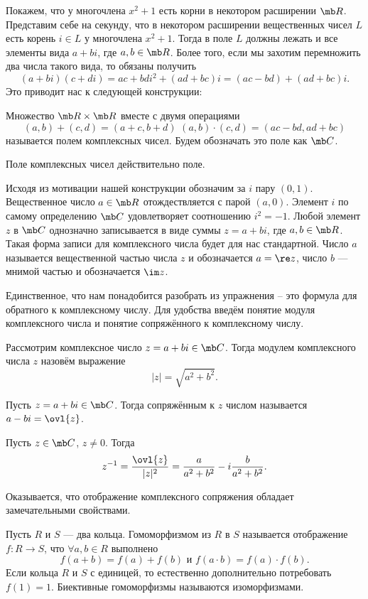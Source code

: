 Покажем, что у многочлена $x^2+1$ есть корни в некотором расширении $\mb R$. Представим себе на секунду, что в некотором расширении вещественных чисел $L$ есть корень $i\in L$ у многочлена $x^2+1$. Тогда в поле $L$ должны лежать и все элементы вида $a+bi$, где $a,b\in \mb R$. Более того, если мы захотим перемножить два числа такого вида, то обязаны получить $$(a+bi)(c+di)=ac+bdi^2+(ad+bc)i=(ac-bd)+(ad+bc)i.$$
Это приводит нас к следующей конструкции:

 Множество $\mb R \times \mb R$ вместе с двумя операциями $$(a,b)+(c,d)=(a+c,b+d)\,\,(a,b)\cdot(c,d)=(ac-bd,ad+bc)$$
называется полем комплексных чисел. Будем обозначать это  поле как $\mb C$.
\edfn

\upr Поле комплексных чисел действительно поле.
\eupr

Исходя из мотивации нашей конструкции обозначим за $i$ пару $(0,1)$. Вещественное число $a\in \mb R$ отождествляется с парой $(a,0)$. Элемент $i$ по самому определению $\mb C$ удовлетворяет соотношению $i^2=-1$. Любой элемент $z$ в $\mb C$ однозначно записывается в виде суммы $z=a+bi$, где $a,b\in \mb R$.  Такая форма записи для комплексного числа будет для нас стандартной. Число $a$ называется вещественной частью числа $z$ и обозначается $a=\re z$, число $b$ --- мнимой частью и обозначается $\im z$.

Единственное, что нам понадобится разобрать из упражнения -- это формула для обратного  к комплексному числу. Для удобства введём понятие модуля комплексного числа и понятие сопряжённого к комплексному числу.

 Рассмотрим комплексное число $z=a+bi\in \mb C$. Тогда модулем комплексного числа $z$ назовём выражение
$$|z|=\sqrt{a^2+b^2}.$$
\edfn

 Пусть $z=a+bi\in \mb C$. Тогда сопряжённым к $z$ числом называется $a-bi=\ovl{z}$.
\edfn

 Пусть $z\in \mb C$, $z\neq 0$. Тогда
$$ z^{-1} =\frac{\ovl{z}}{|z|^2}= \frac{a}{a^2+b^2}-i\frac{b}{a^2+b^2}.$$
\elm

Оказывается, что отображение комплексного сопряжения обладает замечательными свойствами.


 Пусть $R$ и $S$ --- два кольца. Гомоморфизмом из $R$ в $S$ называется отображение $f\colon R \to S$, что
$\forall a,b \in R$ выполнено 
$$f(a+b)=f(a)+f(b)\text{  и  }f(a\cdot b)=f(a) \cdot f(b).$$
Если кольца $R$ и $S$ с единицей, то естественно дополнительно потребовать $f(1) = 1$. Биективные гомоморфизмы называются  изоморфизмами.
\edfn


